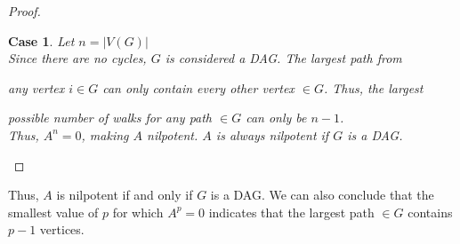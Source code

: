 \documentclass{article}
\theoremstyle{plain}
\newtheorem{case}{Case}
\theoremstyle{nonumberplain}
\newtheorem{proof}{Proof}
\begin{document}
\begin{proof}
\begin{case}
        Let $n = |V(G)|$ \\
        
        Since there are no cycles, $G$ is considered a DAG. The largest path from 
        
        any vertex $i \in G$ can only contain every other vertex $\in G$. Thus, the largest 
        
        possible number of walks for any path $\in G$ can only be $n-1$. \\
        
        Thus, $A^n = 0$, making $A$ nilpotent. $A$ is always nilpotent if $G$ is a DAG.
        \end{case}
   \end{proof}
    Thus, $A$ is nilpotent if and only if $G$ is a DAG. We can also conclude that the smallest value of $p$ for which $A^p = 0$ indicates that the largest path $\in G$ contains $p - 1$ vertices.
\end{document}
